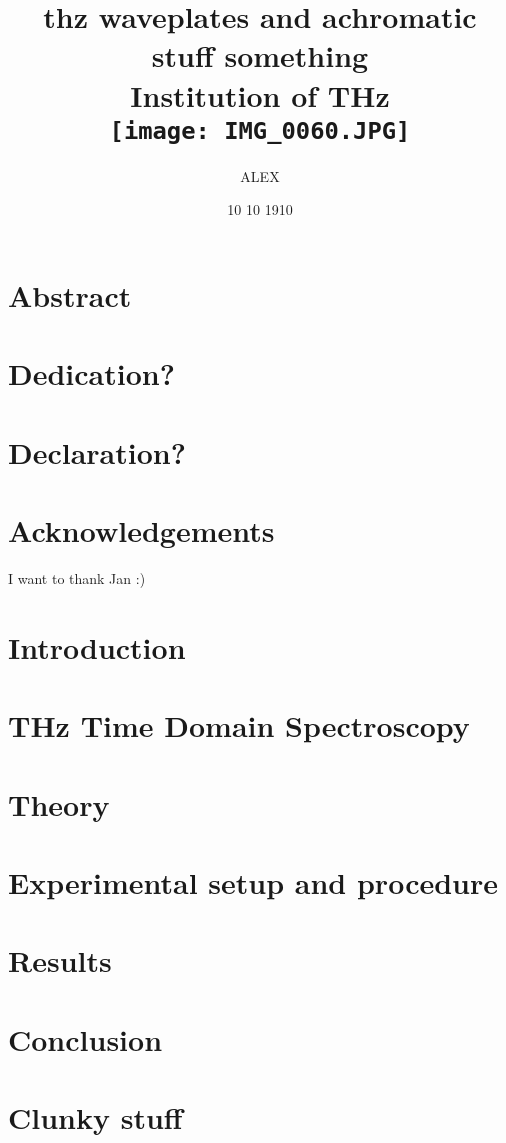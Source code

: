 \documentclass[12pt]{report}
\title{
{thz waveplates and achromatic stuff something}\\
{\large Institution of THz}\\
{\texttt{[image: IMG\_0060.JPG]}}
}
\author{ALEX}
\date{10 10 1910}
\begin{document}
\maketitle

\chapter*{Abstract}

\chapter*{Dedication?}

\chapter*{Declaration?}

\chapter*{Acknowledgements}
I want to thank Jan :)

\tableofcontents

\chapter{Introduction}


\chapter{THz Time Domain Spectroscopy}


\chapter{Theory}


\chapter{Experimental setup and procedure}


\chapter{Results}


\chapter{Conclusion}


\appendix
\chapter{Clunky stuff}


\printbibliography

\end{document}
